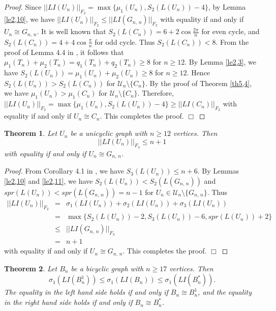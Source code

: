 \documentclass[12pt, a4paper]{article}
\newtheorem{theorem}{Theorem}[section]
\begin{document}
\begin{proof}
Since $||LI(U_n)||_{F_2}=\max\{\mu_1(U_n), S_2(L(U_n))-4 \}$, by Lemma \ref{le2,10}, we have $||LI(U_n)||_{F_2}\leq ||LI(G_{n,\,n})||_{F_2}$ with equality if and only if $U_n\cong G_{n,\,n}$. It is well known that $S_2(L(C_n))=6+2\cos\frac{2\pi}{n}$ for even cycle, and $S_2(L(C_n))=4+4\cos\frac{\pi}{n}$ for odd cycle. Thus $S_2(L(C_n))<8$. From the proof of Lemma 4.4 in \cite{LHS}, it follows that $\mu_1(T_n)+\mu_2(T_n)=q_1(T_n)+q_2(T_n)\geq 8$ for $n\geq 12$. By Lemma \ref{le2,3}, we have $S_2(L(U_n))=\mu_1(U_n)+\mu_2(U_n)\geq 8$ for $n\geq 12$. Hence $S_2(L(U_n))>S_2(L(C_n))$ for $\mathcal{U}_n\setminus \{C_n\}$. By the proof of Theorem \ref{th5,4}, we have $\mu_1(U_n)>\mu_1(C_n)$ for $\mathcal{U}_n\setminus \{C_n\}$. Therefore, $||LI(U_n)||_{F_2}=\max\{\mu_1(U_n), S_2(L(U_n))-4 \} \geq ||LI(C_n)||_{F_2}$ with equality if and only if $U_n\cong C_n$. This completes the proof. $\Box$
\end{proof}

\begin{theorem}\label{th5,6} %
Let $U_n$ be a unicyclic graph with $n\geq 12$ vertices. Then
$$ ||LI(U_n)||_{F_3}\leq n+1$$
with equality if and only if $U_n\cong G_{n,\,n}$.
\end{theorem}

\begin{proof} From Corollary 4.1 in \cite{DZ}, we have $S_3(L(U_n))\leq n+6$. By Lemmas \ref{le2,10} and \ref{le2,11}, we have $S_2(L(U_n))< S_2(L(G_{n,\,n}))$ and $spr(L(U_n))<spr(L(G_{n,\,n}))=n-1$ for
$U_n\in \mathcal{U}_n\setminus \{G_{n,\,n}\}$. Thus
\begin{eqnarray*}
||LI(U_n)||_{F_2} & = & \sigma_1(LI(U_n))+\sigma_2(LI(U_n))+\sigma_3(LI(U_n))\\
& = &  \max\{S_2(L(U_n))-2, S_3(L(U_n))-6, spr(L(U_n))+2\}\\
& \leq & ||LI(G_{n,\,n})||_{F_3}\\
& = & n+1
\end{eqnarray*}
with equality if and only if $U_n\cong G_{n,\,n}$.
This completes the proof. $\Box$
\end{proof}



\begin{theorem}\label{th5,7} %
Let $B_n$ be a bicyclic graph with $n\geq 17$ vertices. Then
$$\sigma_1(LI(B_n^1))\leq \sigma_1(LI(B_n))\leq \sigma_1(LI(B_n^{*})).$$
The equality in the left hand side holds if and only if $B_n\cong B_n^1$, and the equality in the right hand side holds if and only if $B_n\cong B_n^{*}$.
\end{theorem}
\end{document}
